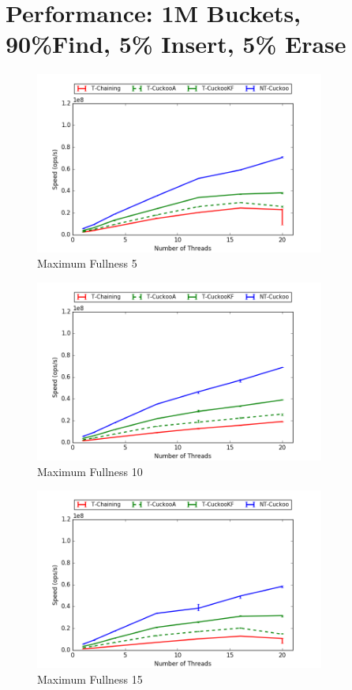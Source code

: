 \section{Performance: 1M Buckets, 90\%Find, 5\% Insert, 5\% Erase}
\begin{figure}[H]
    \centering
	\includegraphics[width=0.85\textwidth]{maps/5HM1M:F90,I5,E5.png} 
        \caption*{Maximum Fullness 5}
\end{figure}
\begin{figure}[H]
    \centering
	\includegraphics[width=0.85\textwidth]{maps/10HM1M:F90,I5,E5.png} 
        \caption*{Maximum Fullness 10}
\end{figure}
\begin{figure}[H]
    \centering
	\includegraphics[width=0.85\textwidth]{maps/15HM1M:F90,I5,E5.png} 
        \caption*{Maximum Fullness 15}
\end{figure}


